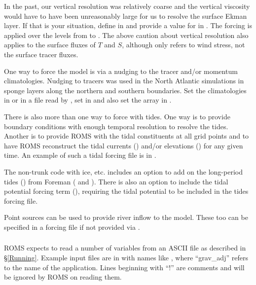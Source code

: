 In the past, our vertical resolution was relatively coarse and the
vertical viscosity would have to have been unreasonably large for
us to resolve the surface Ekman layer.  If that is your situation,
define  in  and provide a value for
 in .  The forcing is applied over the
levels from  to .  The above caution about
vertical resolution also applies to the surface fluxes of $T$ and
$S$, although  only refers to wind stress, not the
surface tracer fluxes.

\smallskip
{}

One way to force the model is via a nudging to the tracer and/or
momentum climatologies. Nudging to tracers was used in the North
Atlantic simulations in sponge layers along the northern and southern
boundaries. Set the climatologies in  or in a
file read by , set  in
 and also set the array  in
.

\smallskip
{}

There is also more than one way to force with tides. One way is to
provide boundary conditions with enough temporal resolution to
resolve the tides. Another is to provide ROMS with the tidal
constituents at all grid points and to have ROMS reconstruct the
tidal currents ()  and/or elevations ()
for any given time. An example of such a tidal forcing file is in
.

The non-trunk code with ice, etc. includes an option to
add on the long-period tides () from Foreman
(\cite{Foreman_96a} and \cite{Foreman_96b}). There is also an option to include the tidal potential
forcing term (), requiring the tidal potential to
be included in the tides forcing file.

\smallskip
{}

Point sources can be used to provide river inflow to the model.
These too can be specified in a forcing file if not provided via
.

\subsubsection{}
\label{ASCII_in}
ROMS expects to read a number of variables from an ASCII file as described
in \S\ref{Running}.
Example input files are in  with names like
, where ``grav\_adj'' refers to the name of
the application. Lines beginning with ``!'' are comments and will be
ignored by ROMS on reading them.

